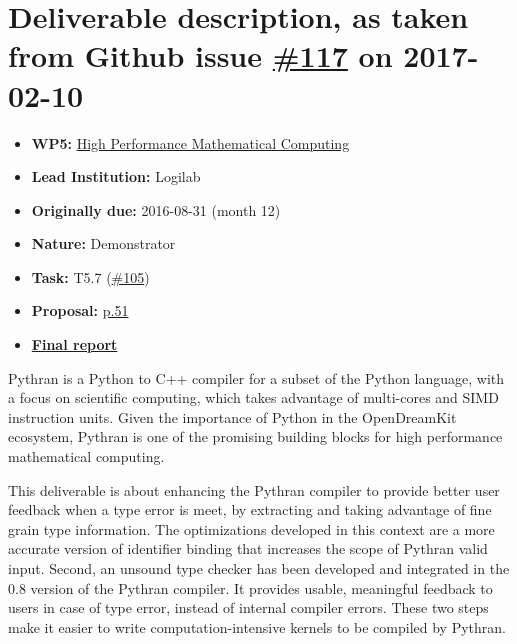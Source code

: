 \section*{\texorpdfstring{Deliverable description, as taken from Github
issue
\href{https://github.com/OpenDreamKit/OpenDreamKit/issues/117}{\#117} on
2017-02-10}{Deliverable description, as taken from Github issue \#117 on 2017-02-10}}\label{deliverable-description-as-taken-from-github-issue-117-on-2017-02-10}

\begin{itemize}
\tightlist
\item
  \textbf{WP5:}
  \href{https://github.com/OpenDreamKit/OpenDreamKit/tree/master/WP5}{High
  Performance Mathematical Computing}
\item
  \textbf{Lead Institution:} Logilab
\item
  \textbf{Originally due:} 2016-08-31 (month 12)
\item
  \textbf{Nature:} Demonstrator
\item
  \textbf{Task:} T5.7
  (\href{https://github.com/OpenDreamKit/OpenDreamKit/issues/105}{\#105})
\item
  \textbf{Proposal:}
  \href{https://github.com/OpenDreamKit/OpenDreamKit/raw/master/Proposal/proposal-www.pdf}{p.51}
\item
  \textbf{\href{https://github.com/OpenDreamKit/OpenDreamKit/raw/master/WP5/D5.4/report-final.pdf}{Final
  report}}
\end{itemize}

Pythran is a Python to C++ compiler for a subset of the Python language,
with a focus on scientific computing, which takes advantage of
multi-cores and SIMD instruction units. Given the importance of Python
in the OpenDreamKit ecosystem, Pythran is one of the promising building
blocks for high performance mathematical computing.

This deliverable is about enhancing the Pythran compiler to provide
better user feedback when a type error is meet, by extracting and taking
advantage of fine grain type information. The optimizations developed in
this context are a more accurate version of identifier binding that
increases the scope of Pythran valid input. Second, an unsound type
checker has been developed and integrated in the 0.8 version of the
Pythran compiler. It provides usable, meaningful feedback to users in
case of type error, instead of internal compiler errors. These two steps
make it easier to write computation-intensive kernels to be compiled by
Pythran.
